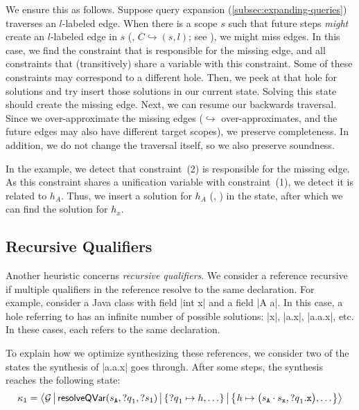 We ensure this as follows.
Suppose query expansion (\cref{subsec:expanding-queries}) traverses an $l$-labeled edge.
When there is a scope $s$ such that future steps \emph{might} create an $l$-labeled edge in $s$ (\ie, $\overline{C} \hookrightarrow (s, l)$; see \citet[\S{}5.3]{RouvoetAPKV20}), we might miss edges.
In this case, we find the constraint that is responsible for the missing edge, and all constraints that (transitively) share a variable with this constraint.
Some of these constraints may correspond to a different hole.
Then, we peek at that hole for solutions and try insert those solutions in our current state.
Solving this state should create the missing edge.
Next, we can resume our backwards traversal.
%
Since we over-approximate the missing edges ($\hookrightarrow$ over-approximates, and the future edges may also have different target scopes), we preserve completeness.
In addition, we do not change the traversal itself, so we also preserve soundness.

In the example, we detect that constraint~(2) is responsible for the missing edge.
As this constraint shares a unification variable with constraint~(1), we detect it is related to $h_A$.
Thus, we insert a solution for $h_A$ (\eg, ) in the state, after which we can find the solution  for $h_x$.


\subsection{Recursive Qualifiers}%
\label{subsec:recursive-qualifiers}

Another heuristic concerns \emph{recursive qualifiers}.
We consider a reference recursive if multiple qualifiers in the reference resolve to the same declaration.
For example, consider a Java class  with field \Java|int x| and a field \Java|A a|.
In this case, a hole referring to  has an infinite number of possible solutions: \Java|x|, \Java|a.x|, \Java|a.a.x|, etc.
In these cases, each  refers to the same declaration.

To explain how we optimize synthesizing these references, we consider two of the states the synthesis of \Java|a.a.x| goes through.
After some steps, the synthesis reaches the following state:
\[
  \kappa_1 = \left\langle
    \mathcal{G}
    \mkern3mu \middle| \mkern3mu \mathsf{resolveQVar}(s_{\texttt{A}}, \text{?$q$}_1, \text{?$s$}_1)
    \mkern3mu \middle| \mkern3mu \left\{\mkern1mu  \text{?$q$}_1 \mapsto h, \ldots  \mkern1mu\right\}
    \mkern3mu \middle| \mkern3mu \left\{\mkern1mu  h \mapsto \big(s_{\texttt{A}} \cdot s_{\texttt{x}}, \text{?$q$}_1.\texttt{x}\big), \ldots  \mkern1mu\right\}
  \right\rangle
\]

